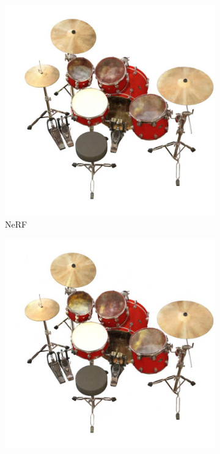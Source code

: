 \documentclass[12pt, a4paper, twoside]{book}
\numberwithin{equation}{chapter}
\numberwithin{theorem}{section}
\numberwithin{definition}{section}
\numberwithin{definitionChapter}{chapter}
\begin{document}
\begin{figure}[H]
\begin{subfigure}{0.475\textwidth}
			\includegraphics[scale=0.25]{img/nerf/nerf_drums_3.jpg}
			\caption{NeRF}
		\end{subfigure}
		\begin{subfigure}{0.475\textwidth}
			\centering
			\includegraphics[scale=0.25]{img/mipnerf/mipnerf_drums_3.jpg}

\end{subfigure}
\end{figure}
\end{document}
